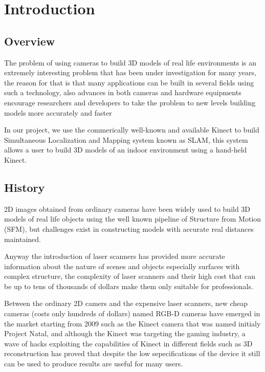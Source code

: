 \chapter{Introduction}
\section{Overview}

The problem of using cameras to build 3D models of real life environments is
an extremely interesting problem that has been under investigation for many years, the reason for that is that many applications can be built in several
fields using such a technology, also advances in both cameras and hardware equipments encourage researchers and developers to take the problem to new levels building models more accurately and faster

In our project, we use the commerically well-known and available Kinect to build Simultaneous Localization and Mapping system known as SLAM, this system allows
a user to build 3D models of an indoor environment using a hand-held Kinect.

\section{History}

2D images obtained from ordinary cameras have been widely used to build 3D models of real life objects using the well known pipeline of Structure from Motion (SFM), but challenges exist in constructing models with accurate real distances maintained.

Anyway the introduction of laser scanners has provided more accurate information about the nature of scenes and objects especially surfaces with complex structure, the complexity of laser scanners and their high cost that can be up to tens of thousands of dollars make them only suitable for professionals.

Between the ordinary 2D camers and the expensive laser scanners, new cheap cameras (costs only hundreds of dollars) named RGB-D cameras have emerged in the market starting from 2009 such as the Kinect camera that was named initialy Project Natal, and although the Kinect was targeting the gaming industry, a wave of hacks exploiting the capabilities of Kinect in different fields such as 3D reconstruction has proved that despite the low sepecifications of the device it still can be used to produce results are useful for many users.

